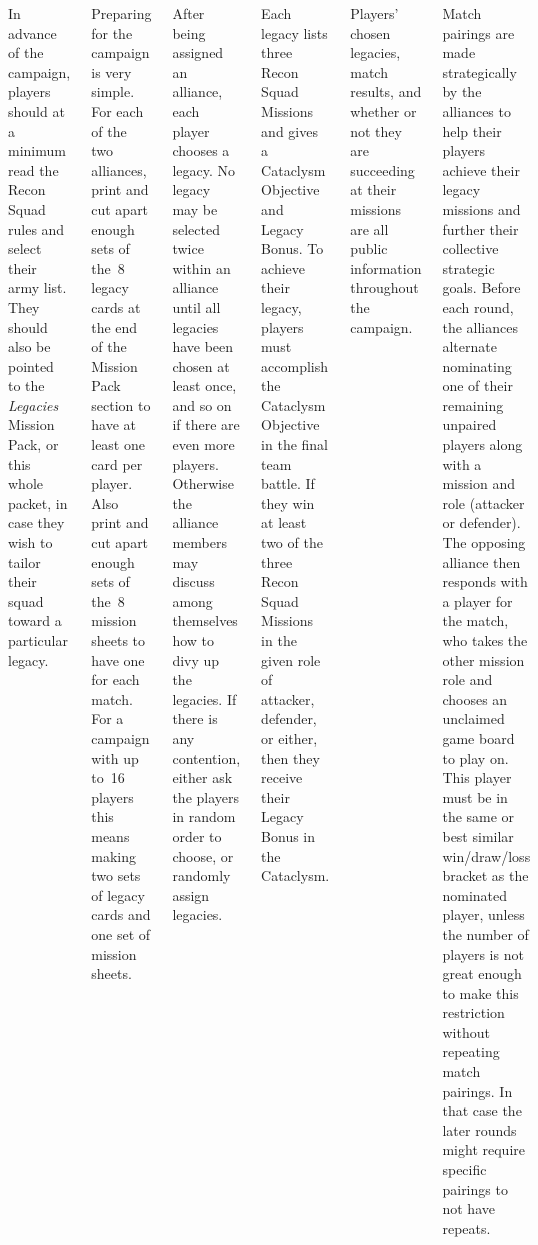 \begin{columns}
In advance of the campaign, players should at a minimum read the Recon
Squad rules and select their army list.  They should also be pointed
to the \emph{Legacies} Mission Pack, or this whole packet, in case
they wish to tailor their squad toward a particular legacy.

Preparing for the campaign is very simple.  For each of the two
alliances, print and cut apart enough sets of the~8 legacy cards at
the end of the Mission Pack section to have at least one card per
player.  Also print and cut apart enough sets of the~8 mission sheets
to have one for each match.  For a campaign with up to~16 players this
means making two sets of legacy cards and one set of mission sheets.


After being assigned an alliance, each player chooses a legacy.  No
legacy may be selected twice within an alliance until all legacies
have been chosen at least once, and so on if there are even more
players.  Otherwise the alliance members may discuss among themselves
how to divy up the legacies.  If there is any contention, either ask
the players in random order to choose, or randomly assign legacies.

Each legacy lists three Recon Squad Missions and gives a Cataclysm
Objective and Legacy Bonus.  To achieve their legacy, players must
accomplish the Cataclysm Objective in the final team battle.  If they
win at least two of the three Recon Squad Missions in the given role
of attacker, defender, or either, then they receive their Legacy Bonus
in the Cataclysm.

Players' chosen legacies, match results, and whether or not they are
succeeding at their missions are all public information throughout the
campaign.


Match pairings are made strategically by the alliances to help their
players achieve their legacy missions and further their collective
strategic goals.  Before each round, the alliances alternate
nominating one of their remaining unpaired players along with a
mission and role (attacker or defender).  The opposing alliance then
responds with a player for the match, who takes the other mission role
and chooses an unclaimed game board to play on.  This player must be
in the same or best similar win/draw/loss bracket as the nominated
player, unless the number of players is not great enough to make this
restriction without repeating match pairings.  In that case the later
rounds might require specific pairings to not have repeats.


\end{columns}

